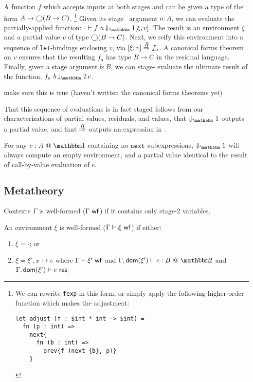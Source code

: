 A function $f$ which accepts inputs at both stages \bbone{} and \bbtwo{} can be
given a type of the form $A\to\bigcirc(B\to C)$.%
\cprotect\footnote{We can rewrite \texttt{fexp} in this form, or simply apply
the following higher-order function which makes the adjustment:
\begin{lstlisting} 
let adjust (f : $int * int -> $int) =
  fn (p : int) => 
    next{
      fn (b : int) => 
        prev{f (next {b}, p)}
    }
\end{lstlisting}}
%
Given its stage \bbone\ argument $a:A$, we can evaluate the partially-applied
function:
$\cdot\vdash f~a \mathop{\redonesym} [\xi,v]$.
The result is an environment $\xi$ and a partial value $v$ of type $\bigcirc(B\to
C)$. Next, we reify this environment into a sequence of \verb|let|-bindings
enclosing $v$, via $[{\xi};{v}]\overset{R}\Rightarrow{f_a}$. A canonical forms theorem on $v$
ensures that the resulting $f_a$ has type $B\to C$ in the residual language.
Finally, given a stage \bbtwo{} argument $b:B$, we can stage-\bbtwo{} evaluate
the ultimate result of the function, $f_a~b \mathop{\tworedsym} c$.

\TODO make sure this is true (haven't written the canonical forms theorems yet)

That this sequence of evaluations is in fact staged follows from our
characterizations of partial values, residuals, and values, that $\redonesym$
outputs a partial value, and that $\overset{R}\Rightarrow$ outputs an expression in \langTwo.

\begin{remark}
For any $\colone{e}{A}$ containing no ${\tt next}$ subexpressions, $\redonesym$ will
always compute an empty environment, and a partial value identical to the result
of call-by-value evaluation of $e$.
\end{remark}

\subsection{Metatheory}

\begin{definition}
Contexts $\Gamma$ is well-formed ($\Gamma\ \mathsf{wf}$) if it
contains only stage-2 variables.
\end{definition}

\begin{definition}
An environment $\xi$ is well-formed ($\Gamma\vdash\xi\ \mathsf{wf}$) if either:
\begin{enumerate}
\item $\xi = \cdot$; or
\item $\xi = \xi',x\mapsto e$ where
$\Gamma\vdash\xi'\ \mathsf{wf}$ and
$\Gamma,\dom{\xi'}\vdash \coltwo{e}{B}$ and
$\Gamma,\mathsf{dom}(\xi')\vdash e \ \mathsf{res}$.
\end{enumerate}
\end{definition}

